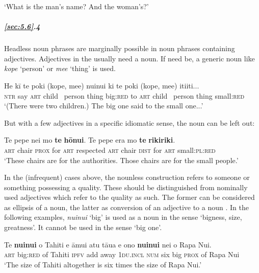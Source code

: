 \glt 
‘What is the man’s name? And the woman’s?’ \textstyleExampleref{[Notes]}
\z

\subparagraph{\ref{sec:5.6}.4} Headless noun phrases are marginally possible in noun phrases containing adjectives. Adjectives in the  usually need a noun. If need be, a generic noun like \textit{kope} ‘person’ or \textit{me{\ꞌ}e} ‘thing’ is used.

\ea\label{ex:5.104}
\gll He kī te poki (kope, me{\ꞌ}e) nuinui ki te poki (kope, me{\ꞌ}e) {\ꞌ}iti{\ꞌ}iti... \\
\textsc{ntr} say \textsc{art} child ~person thing big:\textsc{red} to \textsc{art} child ~person thing small:\textsc{red} \\

\glt
‘(There were two children.) The big one said to the small one...’ \textstyleExampleref{[Notes]}
\z

But with a few adjectives in a specific idiomatic sense, the noun can be left out:

\ea\label{ex:5.105}
\gll Te pepe nei mo \textbf{te} \textbf{hōnui}. Te pepe era mo \textbf{te} \textbf{rikiriki}. \\
\textsc{art} chair \textsc{prox} for \textsc{art} respected \textsc{art} chair \textsc{dist} for \textsc{art} small:\textsc{pl}:\textsc{red} \\

\glt
‘These chairs are for the authorities. Those chairs are for the small people.’ \textstyleExampleref{[Notes]}
\z

In the (infrequent) cases above, the nounless construction refers to someone or something possessing a quality. These should be distinguished from nominally used adjectives which refer to the quality as such. The former can be considered as ellipsis of a noun, the latter as conversion of an adjective to a noun \citep[96]{Bhat1994}. In the following examples, \textit{nuinui} ‘big’ is used as a noun in the sense ‘bigness, size, greatness’. It cannot be used in the sense ‘big one’. 

\ea\label{ex:5.106}
\gll Te \textbf{nuinui} o Tahiti e {\ꞌ}āmui atu tāua e ono \textbf{nuinui} nei o Rapa Nui. \\
\textsc{art} big:\textsc{red} of Tahiti \textsc{ipfv} add away \textsc{1du.incl} \textsc{num} six big \textsc{prox} of Rapa Nui \\

\glt 
‘The size of Tahiti altogether is six times the size of Rapa Nui.’ \textstyleExampleref{[R348.003]} 
\z

